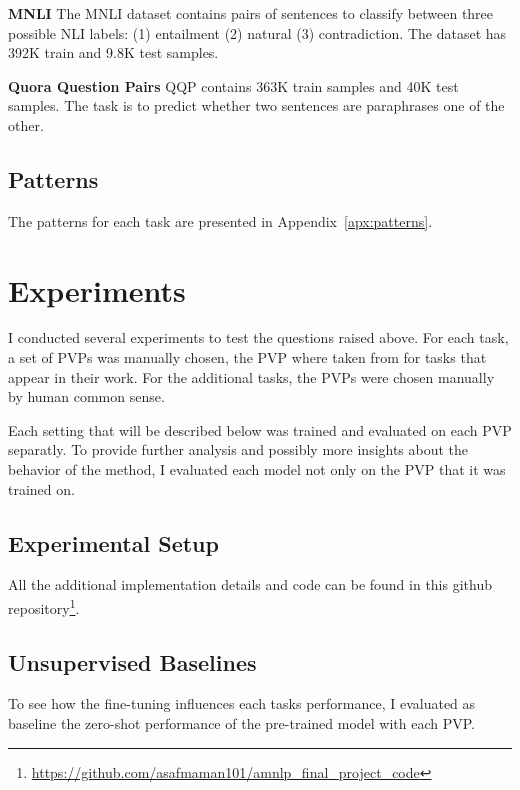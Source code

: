 \documentclass[11pt,a4paper]{article}
\begin{document}
\vspace{8pt}
\noindent \textbf{MNLI} \quad
The MNLI dataset contains pairs of sentences to classify between three possible NLI labels: (1) entailment (2) natural (3) contradiction. 
The dataset has 392K train and 9.8K test samples. 

\vspace{8pt}
\noindent \textbf{Quora Question Pairs} \quad
QQP contains 363K train samples and 40K test samples.
The task is to predict whether two sentences are paraphrases one of the other.

\subsection{Patterns}
The patterns for each task are presented in Appendix~\ref{apx:patterns}.


\section{Experiments}
\label{sec:experiments}

I conducted several experiments to test the questions raised above.
For each task, a set of PVPs was manually chosen, the PVP where taken from \citet{schick2020exploiting} for tasks that appear in their work.
For the additional tasks, the PVPs were chosen manually by human common sense. 

Each setting that will be described below was trained and evaluated on each PVP separatly.
To provide further analysis and possibly more insights about the behavior of the method, I evaluated each model not only on the PVP that it was trained on.

\subsection{Experimental Setup}
\label{sub-sec:experimental-setup}

All the additional implementation details and code can be found in this github repository\footnote{\url{https://github.com/asafmaman101/amnlp_final_project_code}}.

\subsection{Unsupervised Baselines}
To see how the fine-tuning influences each tasks performance, I evaluated as baseline the zero-shot performance of the pre-trained model with each PVP.
\end{document}
